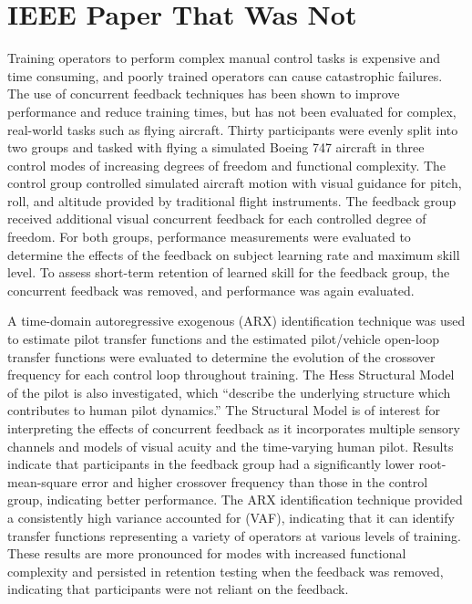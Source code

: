 % 

\chapter{IEEE Paper That Was Not}
Training operators to perform complex manual control tasks is expensive and time consuming, and poorly trained operators can cause catastrophic failures.
The use of concurrent feedback techniques has been shown to improve performance and reduce training times, but has not been evaluated for complex, real-world tasks such as flying aircraft.
Thirty participants were evenly split into two groups and tasked with flying a simulated Boeing 747 aircraft in three control modes of increasing degrees of freedom and functional complexity.
The control group controlled simulated aircraft motion with visual guidance for pitch, roll, and altitude provided by traditional flight instruments.
The feedback group received additional visual concurrent feedback for each controlled degree of freedom.
For both groups, performance measurements were evaluated to determine the effects of the feedback on subject learning rate and maximum skill level.
To assess short-term retention of learned skill for the feedback group, the concurrent feedback was removed, and performance was again evaluated.

A time-domain autoregressive exogenous (ARX) identification technique was used to estimate pilot transfer functions and the estimated pilot/vehicle open-loop transfer functions were evaluated to determine the evolution of the crossover frequency for each control loop throughout training.
The Hess Structural Model of the pilot is also investigated, which “describe the underlying structure which contributes to human pilot dynamics.'' The Structural Model is of interest for interpreting the effects of concurrent feedback as it incorporates multiple sensory channels and models of visual acuity and the time-varying human pilot.
Results indicate that participants in the feedback group had a significantly lower root-mean-square error and higher crossover frequency than those in the control group, indicating better performance.
The ARX identification technique provided a consistently high variance accounted for (VAF), indicating that it can identify transfer functions representing a variety of operators at various levels of training.
These results are more pronounced for modes with increased functional complexity and persisted in retention testing when the feedback was removed, indicating that participants were not reliant on the feedback.

